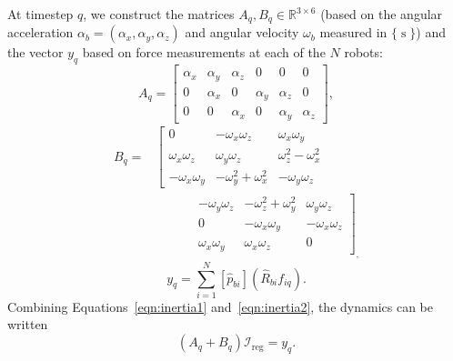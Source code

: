 \documentclass[letterpaper, 10 pt, journal, twoside]{IEEEtran}
\newcommand{\real}{\mathbb{R}}
\newcommand{\inertia}{{\mathcal{I}}}
\newcommand{\frames}{\operatorname{s}}
\newcommand{\frameb}{\operatorname{b}}
\begin{document}
At timestep $q$, we construct the matrices $A_q, B_q \in \real^{3 \times 6}$ (based on the angular acceleration $\alpha_b = (\alpha_x, \alpha_y, \alpha_z)$ and angular velocity $\omega_b$ measured in $\{\frames\}$) and the vector $y_q$ based on force measurements at each of the $N$ robots:
\begin{equation}
    A_q = 
    \begin{bmatrix}
        \alpha_{x} & \alpha_{y} & \alpha_{z} & 0 & 0 & 0 \\
        0 & \alpha_{x} & 0 & \alpha_{y} & \alpha_{z} & 0 \\
        0 & 0 & \alpha_{x} & 0 & \alpha_{y} & \alpha_{z} 
    \end{bmatrix},
\end{equation}
    \begin{align}  
        B_q = 
        &\left[
        \begin{array}{ccc}
        0 & -\omega_{x}\omega_{z} & \omega_{x}\omega_{y} \\
        \omega_{x}\omega_{z} & \omega_{y}\omega_{z} & \omega_{z}^2 - \omega_{x}^2 \\
        -\omega_{x}\omega_{y} & -\omega_{y}^2 + \omega_{x}^2 & -\omega_{y}\omega_{z}
        \end{array}
        \right. \\[10pt]
        & \quad\quad\quad \left.
        \begin{array}{ccc}
        -\omega_{y}\omega_{z} & -\omega_{z}^2 + \omega_{y}^2 & \omega_{y}\omega_{z} \\
        0 & -\omega_{x}\omega_{y} & -\omega_{x}\omega_{z} \\
        \omega_{x}\omega_{y} & \omega_{x}\omega_{z} & 0
        \end{array}
        \right]_, \nonumber
    \end{align}
\begin{equation}
    y_q = \sum_{i=1}^{N} [\hat{p}_{bi}](\hat{R}_{bi}f_{iq}).
\end{equation}
Combining Equations~\eqref{eqn:inertia1} and~\eqref{eqn:inertia2}, the dynamics can be written 
\begin{equation}
    (A_q + B_q) \inertia_{\operatorname{reg}} = y_q. 
\end{equation}
\end{document}
